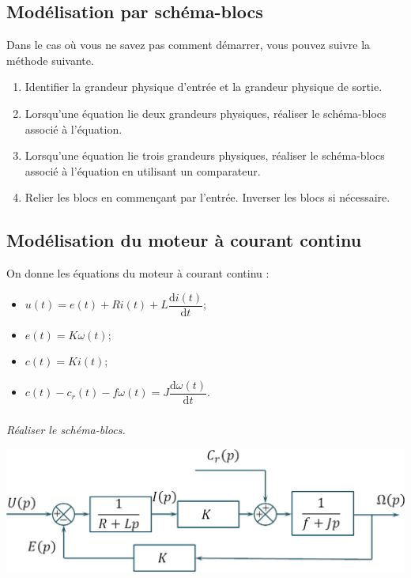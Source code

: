 \documentclass[10pt,fleqn]{article} %
\begin{document}

\vspace{6cm}
\pagestyle{fancy}
\thispagestyle{plain}

\def\columnseprulecolor{\color{ocre}}
\setlength{\columnseprule}{0.4pt} 


\begin{multicols}{2}
\section*{Modélisation par schéma-blocs}

\begin{methode}
Dans le cas où vous ne savez pas comment démarrer, vous pouvez suivre la méthode suivante.
\begin{enumerate}
\item Identifier la grandeur physique d'entrée et la grandeur physique de sortie.
\item Lorsqu'une équation lie deux grandeurs physiques, réaliser le schéma-blocs associé à l'équation. 
\item Lorsqu'une équation lie trois grandeurs physiques, réaliser le schéma-blocs associé à l'équation en utilisant un comparateur.
\item Relier les blocs en commençant par l'entrée. Inverser les blocs si nécessaire.
\end{enumerate}
\end{methode}
\subsection*{Modélisation du moteur à courant continu}
On donne les équations du moteur à courant continu :
\begin{itemize}
\item $u(t) = e(t)+ Ri(t) +L \dfrac{\text{d}i(t)}{\text{d} t}$;
\item $e(t)=K\omega(t)$;
\item $c(t)=Ki(t)$;
\item $c(t)-c_r(t) - f\omega(t)=J\dfrac{\text{d}\omega(t)}{\text{d} t}$.
\end{itemize}
\subparagraph{}
\textit{Réaliser le schéma-blocs.}

\ifprof
\begin{corrige}
\begin{center}
\includegraphics[width=.9\linewidth]{images/cor_01}
\end{center}
\end{corrige}
\else
\fi


\end{multicols}
\end{document}
